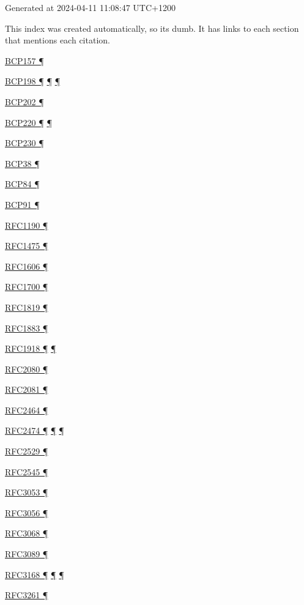 \documentclass[
]{article}
\begin{document}
Generated at 2024-04-11 11:08:47 UTC+1200

This index was created automatically, so it\textquotesingle s dumb. It
has links to each section that mentions each citation.

\hyperref[addresses]{BCP157 ¶}

\hyperref[addresses]{BCP198 ¶} \hyperref[routing]{¶}
\hyperref[markdown-usage]{¶}

\hyperref[energy-consumption]{BCP202 ¶}

\hyperref[ipv6-basic-technology]{BCP220 ¶} \hyperref[further-reading]{¶}

\hyperref[extension-headers-and-options]{BCP230 ¶}

\hyperref[filtering]{BCP38 ¶}

\hyperref[multi-prefix-operation]{BCP84 ¶}

\hyperref[dns]{BCP91 ¶}

\hyperref[why-version-6]{RFC1190 ¶}

\hyperref[why-version-6]{RFC1475 ¶}

\hyperref[why-version-6]{RFC1606 ¶}

\hyperref[why-version-6]{RFC1700 ¶}

\hyperref[why-version-6]{RFC1819 ¶}

\hyperref[why-version-6]{RFC1883 ¶}

\hyperref[dual-stack-scenarios]{RFC1918 ¶} \hyperref[tunnels]{¶}

\hyperref[routing]{RFC2080 ¶}

\hyperref[routing]{RFC2081 ¶}

\hyperref[layer-2-functions]{RFC2464 ¶}

\hyperref[packet-format]{RFC2474 ¶}
\hyperref[traffic-class-and-flow-label]{¶}
\hyperref[transport-protocols]{¶}

\hyperref[obsolete-techniques]{RFC2529 ¶}

\hyperref[routing]{RFC2545 ¶}

\hyperref[obsolete-techniques]{RFC3053 ¶}

\hyperref[obsolete-techniques]{RFC3056 ¶}

\hyperref[obsolete-techniques]{RFC3068 ¶}

\hyperref[obsolete-techniques]{RFC3089 ¶}

\hyperref[packet-format]{RFC3168 ¶}
\hyperref[traffic-class-and-flow-label]{¶}
\hyperref[transport-protocols]{¶}

\hyperref[transport-protocols]{RFC3261 ¶}
\end{document}
